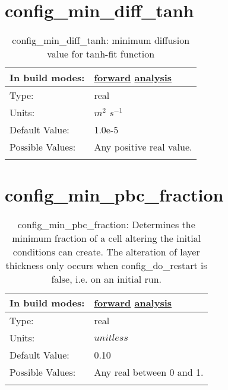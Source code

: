\section[config\_min\_diff\_tanh]{config\_min\_diff\_tanh}
\label{sec:nm_sec_config_min_diff_tanh}
\begin{center}
\begin{longtable}{| p{2.0in} || p{4.0in} |}
    \hline
    In build modes: & \hyperref[subsec:forward_nm_tab_vmix_tanh]{forward} \hyperref[subsec:analysis_nm_tab_vmix_tanh]{analysis} \\
    \hline
    Type: & real \\
    \hline
    Units: & $m^2$ $s^{-1}$ \\
    \hline
    Default Value: & 1.0e-5 \\
    \hline
    Possible Values: & Any positive real value. \\
    \hline
    \caption{config\_min\_diff\_tanh: minimum diffusion value for tanh-fit function}
\end{longtable}
\end{center}
\section[config\_min\_pbc\_fraction]{config\_min\_pbc\_fraction}
\label{sec:nm_sec_config_min_pbc_fraction}
\begin{center}
\begin{longtable}{| p{2.0in} || p{4.0in} |}
    \hline
    In build modes: & \hyperref[subsec:forward_nm_tab_partial_bottom_cells]{forward} \hyperref[subsec:analysis_nm_tab_partial_bottom_cells]{analysis} \\
    \hline
    Type: & real \\
    \hline
    Units: & $unitless$ \\
    \hline
    Default Value: & 0.10 \\
    \hline
    Possible Values: & Any real between 0 and 1. \\
    \hline
    \caption{config\_min\_pbc\_fraction: Determines the minimum fraction of a cell altering the initial conditions can create.  The alteration of layer thickness only occurs when config\_do\_restart is false, i.e. on an initial run.}
\end{longtable}
\end{center}
